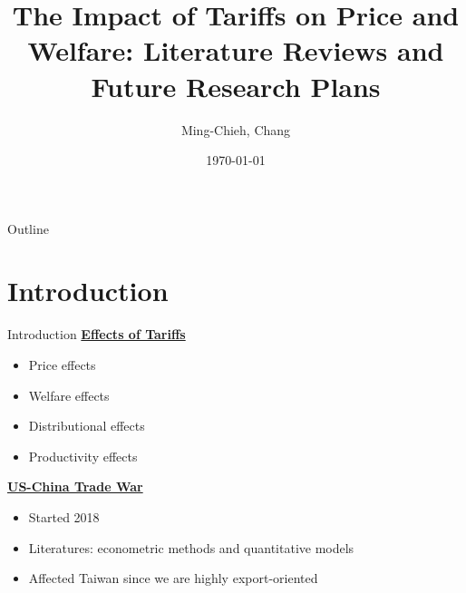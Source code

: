 \documentclass{beamer}
\title[]{The Impact of Tariffs on Price and Welfare: Literature Reviews and Future Research Plans}
\author[]{Ming-Chieh, Chang}
\institute{National Taiwan University}
\date{\today}
\begin{document}
\begin{frame}
    \titlepage 
\end{frame}

\begin{frame}{Outline}
    \tableofcontents
\end{frame}

\section{Introduction}
\begin{frame}{Introduction}
    \underline{\textbf{Effects of Tariffs}}
    \begin{itemize}
        \item Price effects
        \item Welfare effects
        \item Distributional effects
        \item Productivity effects
    \end{itemize}

    \vspace{3mm}

    \underline{\textbf{US-China Trade War}}
    \begin{itemize}
        \item Started 2018
        \item Literatures: econometric methods and quantitative models
        \item Affected {\color{red}Taiwan} since we are highly {\color{red}export-oriented}
    \end{itemize}
\end{frame}
\end{document}
